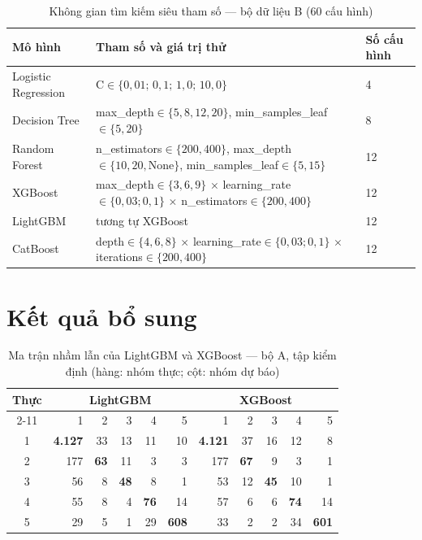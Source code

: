 {\footnotesize
\begin{table}[H]
\centering
\caption{Không gian tìm kiếm siêu tham số --- bộ dữ liệu B (60 cấu hình)}
\label{tab:grid-design-b}
\begin{tabular}{|p{2.6cm}|p{9.3cm}|p{1.2cm}|}
\hline
Mô hình & Tham số và giá trị thử & Số cấu hình\\
\hline
Logistic Regression & C$\in\{0{,}01;\,0{,}1;\,1{,}0;\,10{,}0\}$ & 4\\
\hline
Decision Tree & max\_depth$\in\{5,8,12,20\}$, min\_samples\_leaf$\in\{5,20\}$ & 8\\
\hline
Random Forest & n\_estimators$\in\{200,400\}$, max\_depth$\in\{10,20,\text{None}\}$, min\_samples\_leaf$\in\{5,15\}$ & 12\\
\hline
XGBoost & max\_depth$\in\{3,6,9\}$ $\times$ learning\_rate$\in\{0{,}03;0{,}1\}$ $\times$ n\_estimators$\in\{200,400\}$ & 12\\
\hline
LightGBM & tương tự XGBoost & 12\\
\hline
CatBoost & depth$\in\{4,6,8\}$ $\times$ learning\_rate$\in\{0{,}03;0{,}1\}$ $\times$ iterations$\in\{200,400\}$ & 12\\
\hline
\end{tabular}
\end{table}
}

\section{Kết quả bổ sung}

\begin{table}[H]
\centering
\caption{Ma trận nhầm lẫn của LightGBM và XGBoost --- bộ A, tập kiểm định (hàng: nhóm thực; cột: nhóm dự báo)}
\label{tab:confusion-a}
\begin{tabular}{|c|r|r|r|r|r||r|r|r|r|r|}
\hline
\multirow{2}{*}{Thực} & \multicolumn{5}{c||}{LightGBM} & \multicolumn{5}{c|}{XGBoost}\\
\cline{2-11}
 & 1 & 2 & 3 & 4 & 5 & 1 & 2 & 3 & 4 & 5\\
\hline
1 & \textbf{4.127} & 33 & 13 & 11 & 10 & \textbf{4.121} & 37 & 16 & 12 & 8\\
2 & 177 & \textbf{63} & 11 & 3 & 3 & 177 & \textbf{67} & 9 & 3 & 1\\
3 & 56 & 8 & \textbf{48} & 8 & 1 & 53 & 12 & \textbf{45} & 10 & 1\\
4 & 55 & 8 & 4 & \textbf{76} & 14 & 57 & 6 & 6 & \textbf{74} & 14\\
5 & 29 & 5 & 1 & 29 & \textbf{608} & 33 & 2 & 2 & 34 & \textbf{601}\\
\hline
\end{tabular}
\end{table}

